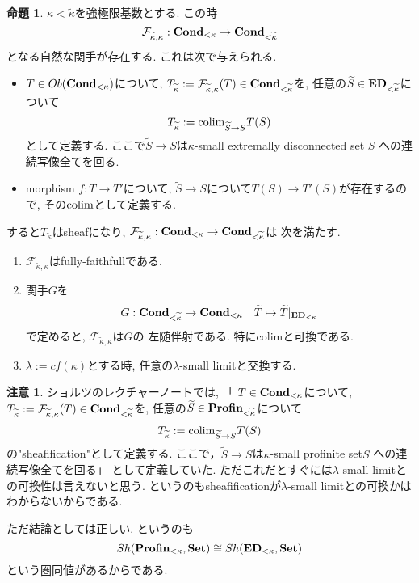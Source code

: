 \documentclass[dvipdfmx,a4paper,11pt]{article}
\newcommand{\colim}{{\rm colim}}
\theoremstyle{definition}
\newtheorem{prop}[thm]{命題}
\newtheorem{rem}[thm]{注意}
\begin{document}
   \begin{tcolorbox}
 [colback = white, colframe = green!35!black, fonttitle = \bfseries,breakable = true]
\begin{prop}\cite[Proposition 2.9]{Sch19}
\label{prop-Sch19-2.9}
$\kappa < \widetilde{\kappa}$を強極限基数とする.
この時
$$
\mathcal{F}_{\widetilde{\kappa}, \kappa} : 
{\bf Cond_{<\kappa}} \to {\bf Cond_{<\widetilde{\kappa}}}
$$
となる自然な関手が存在する. 
これは次で与えられる. 
\begin{itemize}
\item $T \in Ob({\bf Cond_{<\kappa}})$について, $T_{\widetilde{\kappa}} :=\mathcal{F}_{\widetilde{\kappa}, \kappa}(T) \in {\bf Cond_{<\widetilde{\kappa}}}$を, 任意の$\widetilde{S} \in {\bf ED}_{< \widetilde{\kappa}}$について
$$
T_{\widetilde{\kappa}} := \colim_{\widetilde{S} \to S} T(S)
$$
として定義する. ここで$\widetilde{S} \to S$は$\kappa$-small extremally disconnected set $S$ への連続写像全てを回る.
\item morphism $f : T \to T'$について, $\widetilde{S} \to S$について$T(S) \to T'(S)$が存在するので, その$\colim$として定義する. 

\end{itemize}
すると$T_{\widetilde{\kappa}} $はsheafになり, $\mathcal{F}_{\widetilde{\kappa}, \kappa} : {\bf Cond_{<\kappa}} \to {\bf Cond_{<\widetilde{\kappa}}}$は
次を満たす.
\begin{enumerate}
\item $\mathcal{F}_{\widetilde{\kappa}, \kappa} $はfully-faithfullである. 
\item 関手$G$を
$$
G : {\bf Cond_{<\widetilde{\kappa}}} \to {\bf Cond_{<\kappa}} 
\quad \widetilde{T} \mapsto \widetilde{T}|_{{\bf ED}_{< \kappa}}
$$
で定めると, 
$\mathcal{F}_{\widetilde{\kappa}, \kappa}$は$G$の
左随伴射である. 特にcolimと可換である.
\item $\lambda := cf(\kappa)$とする時, 任意の$\lambda$-small limitと交換する. 
\end{enumerate}
 \end{prop}
 \end{tcolorbox}
 \begin{rem}
 ショルツのレクチャーノートでは, 
「 $T \in {\bf Cond_{<\kappa}} $について, $T_{\widetilde{\kappa}} :=\mathcal{F}_{\widetilde{\kappa}, \kappa}(T) \in {\bf Cond_{<\widetilde{\kappa}}}$を, 任意の$\widetilde{S} \in {\bf Profin}_{< \widetilde{\kappa}}$について
$$
T_{\widetilde{\kappa}} := \colim_{\widetilde{S} \to S} T(S)
$$
の"sheafification"として定義する. ここで，$\widetilde{S} \to S$は$\kappa$-small profinite set$S$ への連続写像全てを回る」
として定義していた.
ただこれだとすぐには$\lambda$-small limitとの可換性は言えないと思う. というのもsheafificationが$\lambda$-small limitとの可換かはわからないからである. 

ただ結論としては正しい. というのも
$$
Sh({\bf Profin}_{<\kappa}, {\bf Set}) \cong Sh({\bf ED}_{<\kappa}, {\bf Set}) 
$$
という圏同値があるからである. 

 \end{rem}
\end{document}

